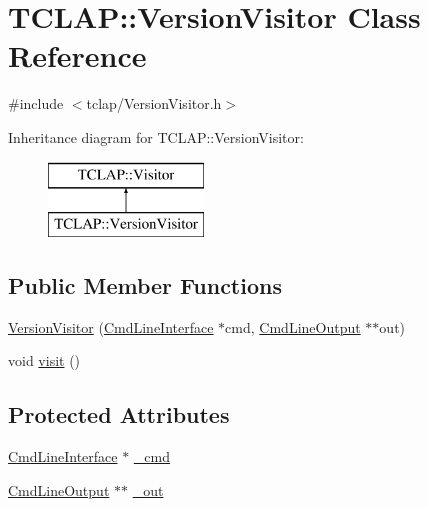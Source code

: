 \hypertarget{class_t_c_l_a_p_1_1_version_visitor}{}\section{T\+C\+L\+A\+P\+:\+:Version\+Visitor Class Reference}
\label{class_t_c_l_a_p_1_1_version_visitor}


{\ttfamily \#include $<$tclap/\+Version\+Visitor.\+h$>$}

Inheritance diagram for T\+C\+L\+A\+P\+:\+:Version\+Visitor\+:\begin{figure}[H]
\begin{center}
\leavevmode
\includegraphics[height=2.000000cm]{class_t_c_l_a_p_1_1_version_visitor}
\end{center}
\end{figure}
\subsection*{Public Member Functions}
\begin{DoxyCompactItemize}
\item 
\hyperlink{class_t_c_l_a_p_1_1_version_visitor_a6e5c16f245e2333dcc568dc9c4e6d537}{Version\+Visitor} (\hyperlink{class_t_c_l_a_p_1_1_cmd_line_interface}{Cmd\+Line\+Interface} $\ast$cmd, \hyperlink{class_t_c_l_a_p_1_1_cmd_line_output}{Cmd\+Line\+Output} $\ast$$\ast$out)
\item 
void \hyperlink{class_t_c_l_a_p_1_1_version_visitor_a30b0d5bd22ac41364d027b94bded4fc0}{visit} ()
\end{DoxyCompactItemize}
\subsection*{Protected Attributes}
\begin{DoxyCompactItemize}
\item 
\hyperlink{class_t_c_l_a_p_1_1_cmd_line_interface}{Cmd\+Line\+Interface} $\ast$ \hyperlink{class_t_c_l_a_p_1_1_version_visitor_ac789d900e73daa8b4b53a1e9b80b756e}{\+\_\+cmd}
\item 
\hyperlink{class_t_c_l_a_p_1_1_cmd_line_output}{Cmd\+Line\+Output} $\ast$$\ast$ \hyperlink{class_t_c_l_a_p_1_1_version_visitor_ab4c9f44a2bd62830e42f79b35ac4d300}{\+\_\+out}
\end{DoxyCompactItemize}


